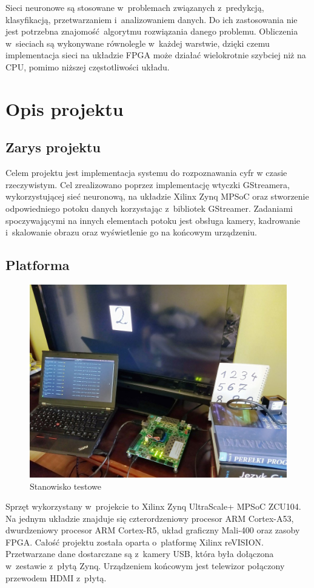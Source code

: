 \documentclass[12pt, oneside, a4paper]{article}
\begin{document}
Sieci neuronowe są stosowane w~problemach
związanych z~predykcją, klasyfikacją, przetwarzaniem i~analizowaniem
danych. Do ich zastosowania nie jest potrzebna znajomość algorytmu rozwiązania
danego problemu. Obliczenia w~sieciach są wykonywane równolegle w~każdej
warstwie, dzięki czemu implementacja sieci na układzie FPGA może działać
wielokrotnie szybciej niż na CPU, pomimo niższej częstotliwości układu.

\newpage
\section{Opis projektu}\label{sec:Opis projektu}

\subsection{Zarys projektu}\label{sec:Zarys projektu}
Celem projektu jest implementacja systemu do rozpoznawania cyfr
w czasie rzeczywistym. Cel zrealizowano poprzez implementację
wtyczki GStreamera, wykorzystującej sieć neuronową, na układzie
Xilinx Zynq MPSoC oraz stworzenie odpowiedniego potoku danych
korzystając z~bibliotek GStreamer. Zadaniami spoczywającymi na innych
elementach potoku jest obsługa kamery,
kadrowanie i~skalowanie obrazu oraz wyświetlenie go na końcowym urządzeniu.

\subsection{Platforma}\label{sec:Platforma}
\begin{figure}[h]
  \centering
  \includegraphics[width=0.9\linewidth]{figures/place_of_work_small.jpg}
  \caption{Stanowisko testowe}\label{fig:stanowisko}
\end{figure}
Sprzęt wykorzystany w~projekcie to Xilinx Zynq UltraScale+ MPSoC ZCU104.
Na jednym układzie znajduje się czterordzeniowy procesor
ARM \mbox{Cortex-A53},
dwurdzeniowy procesor ARM \mbox{Cortex-R5},
układ graficzny \mbox{Mali-400} oraz zasoby FPGA.
Całość projektu została oparta o~platformę Xilinx reVISION. Przetwarzane
dane dostarczane są z~kamery USB, która była dołączona w~zestawie z~płytą Zynq.
Urządzeniem końcowym jest telewizor połączony przewodem HDMI z~płytą.
\end{document}
